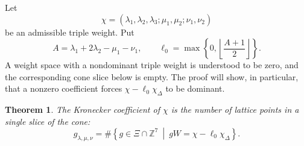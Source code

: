 \documentclass[11pt,reqno]{amsart}
\numberwithin{equation}{section}
\newtheorem{theorem}{Theorem}[section]
\theoremstyle{remark}
\newcommand{\ZZ}{\mathbb{Z}}
\begin{document}
Let
\[ \chi=(\lambda_1,\lambda_2,\lambda_3; \mu_1,\mu_2;\nu_1,\nu_2) \]
be an admissible triple weight.  Put
\begin{equation}
\label{eq:A-and-level}
 A=\lambda_1+2\lambda_2-\mu_1-\nu_1,
 \qquad
 \ell_0=\max\left\{0,\left\lfloor\frac{A+1}{2}\right\rfloor\right\}.
\end{equation}
A weight space with a nondominant triple weight is understood to be zero, and
the corresponding cone slice below is empty.  The proof will show, in
particular, that a nonzero coefficient forces
$\chi-\ell_0\chi_\Delta$ to be dominant.

\begin{theorem}
\label{thm:polyhedral-Kronecker}
The Kronecker coefficient of $\chi$ is the number of lattice points in a
single slice of the cone:
\begin{equation}
\label{eq:polyhedral-Kronecker-count}
 g_{\lambda,\mu,\nu}
 =\#\left\{g\in\Xi\cap\ZZ^7\ \middle|\
        gW=\chi-\ell_0\chi_\Delta\right\}.
\end{equation}
\end{theorem}
\end{document}
